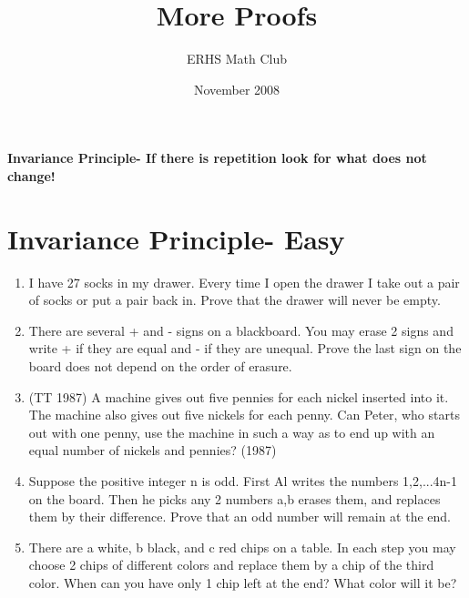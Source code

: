 \documentclass{article}
\title{More Proofs}
\author{ERHS Math Club}
\date{November 2008}
\begin{document}
\maketitle{}
\textbf{Invariance Principle- If there is repetition look for what does not change!}
\section{Invariance Principle- Easy}
\begin{enumerate}
\item I have 27 socks in my drawer. Every time I open the drawer I take out a pair of socks or put a pair back in. Prove that the drawer will never be empty.
\item There are several + and - signs on a blackboard. You may erase 2 signs and write + if they are equal and - if they are unequal. Prove the last sign on the board does not depend on the order of erasure.
\item (TT 1987) A machine gives out five pennies for each nickel inserted into it. The machine also gives out five nickels for each penny. Can Peter, who starts out with one penny, use the machine in such a way as to end up with an equal number of nickels and pennies? (1987)
\item Suppose the positive integer n is odd. First Al writes the numbers 1,2,...4n-1 on the board. Then he picks any 2 numbers a,b erases them, and replaces them by their difference. Prove that an odd number will remain at the end.
\item There are a white, b black, and c red chips on a table. In each step you may choose 2 chips of different colors and replace them by a chip of the third color. When can you have only 1 chip left at the end? What color will it be?
\end{enumerate}
\end{document}
